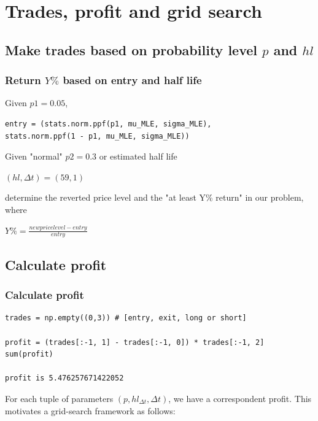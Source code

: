 \documentclass[11pt]{beamer}
\begin{document}
\section*{Trades, profit and grid search}
\subsection*{Make trades based on probability level $p$ and $hl$}
\begin{frame}[fragile]
\frametitle{Return $Y\%$ based on entry and half life}
Given $p1=0.05$,
\begin{verbatim}
entry = (stats.norm.ppf(p1, mu_MLE, sigma_MLE), 
stats.norm.ppf(1 - p1, mu_MLE, sigma_MLE))
\end{verbatim}

Given "normal" $p2=0.3$ or estimated half life 
\begin{center}
$(hl,\Delta t)=(59,1)$
\end{center}
determine the reverted price level and the "at least Y\% return" in our problem, where 
\begin{center}
	$Y\% = \frac{new price level - entry}{entry}$
\end{center}

\end{frame}

\subsection*{Calculate profit}

\begin{frame}[fragile]
\frametitle{Calculate profit}
\begin{verbatim}
trades = np.empty((0,3)) # [entry, exit, long or short]

profit = (trades[:-1, 1] - trades[:-1, 0]) * trades[:-1, 2]
sum(profit)

profit is 5.476257671422052
\end{verbatim}

For each tuple of parameters $(p, hl_{\Delta t}, \Delta t)$, we have a correspondent profit. This motivates a grid-search framework as follows:
\end{frame}
\end{document}
